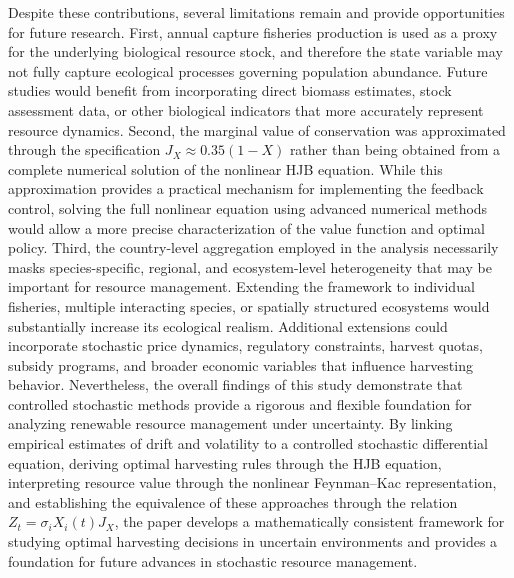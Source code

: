 \documentclass[11pt]{article}
\begin{document}
	Despite these contributions, several limitations remain and provide opportunities for future research. First, annual capture fisheries production is used as a proxy for the underlying biological resource stock, and therefore the state variable may not fully capture ecological processes governing population abundance. Future studies would benefit from incorporating direct biomass estimates, stock assessment data, or other biological indicators that more accurately represent resource dynamics. Second, the marginal value of conservation was approximated through the specification $J_X\approx0.35(1-X)$ rather than being obtained from a complete numerical solution of the nonlinear HJB equation. While this approximation provides a practical mechanism for implementing the feedback control, solving the full nonlinear equation using advanced numerical methods would allow a more precise characterization of the value function and optimal policy. Third, the country-level aggregation employed in the analysis necessarily masks species-specific, regional, and ecosystem-level heterogeneity that may be important for resource management. Extending the framework to individual fisheries, multiple interacting species, or spatially structured ecosystems would substantially increase its ecological realism. Additional extensions could incorporate stochastic price dynamics, regulatory constraints, harvest quotas, subsidy programs, and broader economic variables that influence harvesting behavior. Nevertheless, the overall findings of this study demonstrate that controlled stochastic methods provide a rigorous and flexible foundation for analyzing renewable resource management under uncertainty. By linking empirical estimates of drift and volatility to a controlled stochastic differential equation, deriving optimal harvesting rules through the HJB equation, interpreting resource value through the nonlinear Feynman--Kac representation, and establishing the equivalence of these approaches through the relation $Z_t=\sigma_iX_i(t)J_X$, the paper develops a mathematically consistent framework for studying optimal harvesting decisions in uncertain environments and provides a foundation for future advances in stochastic resource management.
	
	
\end{document}
